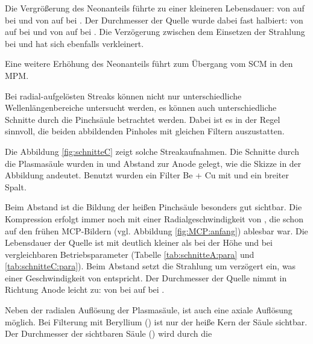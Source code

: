 %
\par
Die Vergrößerung des Neonanteils führte zu einer kleineren
Lebensdauer: von  auf  bei  und von  auf  bei . Der Durchmesser der Quelle wurde dabei fast halbiert:
von  auf  bei 
und von  auf  bei . Die Verzögerung zwischen dem Einsetzen der Strahlung bei
 und  hat sich
ebenfalls verkleinert.
\par
Eine weitere Erhöhung des Neonanteils führt zum Übergang vom SCM
in den MPM.
\par
Bei radial-aufgelösten Streaks können nicht nur unterschiedliche
Wellenlängenbereiche untersucht werden, es können auch
unterschiedliche Schnitte durch die Pinchsäule betrachtet werden.
Dabei ist es in der Regel sinnvoll, die beiden abbildenden
Pinholes mit gleichen Filtern auszustatten.
\par
Die Abbildung \vref{fig:schnitteC} zeigt solche Streakaufnahmen.
Die Schnitte durch die Plasmasäule wurden in  und
 Abstand zur Anode gelegt, wie die Skizze in der
Abbildung andeutet. Benutzt wurden ein Filter  Be
+  Cu mit  und ein
 breiter Spalt.
\par
Beim Abstand  ist die Bildung der heißen Pinchsäule
besonders gut sichtbar. Die Kompression erfolgt immer noch mit einer
Radialgeschwindigkeit von , die schon auf den frühen
MCP-Bildern (vgl. Abbildung \vref{fig:MCP:anfang}) ablesbar war. Die
Lebensdauer der Quelle ist mit  deutlich kleiner als bei
der Höhe  und bei vergleichbaren Betriebsparameter (Tabelle
\ref{tab:schnitteA:para} und \ref{tab:schnitteC:para}). Beim Abstand
 setzt die Strahlung um  verzögert ein, was
einer Geschwindigkeit von  entspricht. Der Durchmesser
der Quelle nimmt in Richtung Anode leicht zu: von  bei
 auf  bei .
%
\label{sec:zweiteKompression}
%
\par
Neben der radialen Auflösung der Plasmasäule, ist auch eine axiale
Auflösung möglich. Bei Filterung mit  Beryllium
() ist nur der heiße Kern der Säule sichtbar.
Der Durchmesser der sichtbaren Säule () wird durch die

